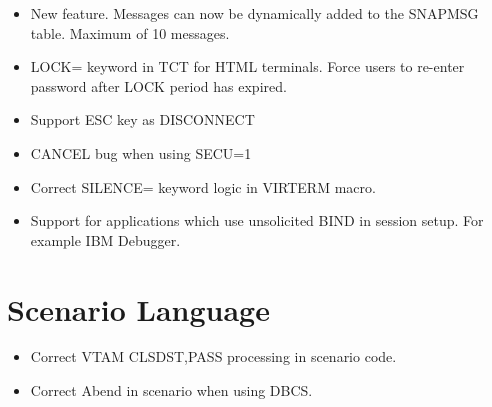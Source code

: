 \documentclass[letterpaper,10pt,english]{sphinxmanual}
\begin{document}
\begin{itemize}
\item {} 
New feature. Messages can now be dynamically added to the SNAPMSG table. Maximum of 10 messages.

\end{itemize}

\begin{itemize}
\item {} 
LOCK= keyword in TCT for HTML terminals. Force users to re-enter password after LOCK period has expired.

\item {} 
Support ESC key as DISCONNECT

\item {} 
CANCEL bug when using SECU=1

\end{itemize}

\begin{itemize}
\item {} 
Correct SILENCE= keyword logic in VIRTERM macro.

\end{itemize}

\begin{itemize}
\item {} 
Support for applications which use unsolicited BIND in session setup. For example IBM Debugger.

\end{itemize}

\newpage


\section{Scenario Language}
\label{\detokenize{TN202101:scenario-language}}
\begin{itemize}
\item {} 
Correct VTAM CLSDST,PASS processing in scenario code.

\end{itemize}

\begin{itemize}
\item {} 
Correct Abend in scenario when using DBCS.

\end{itemize}
\end{document}
